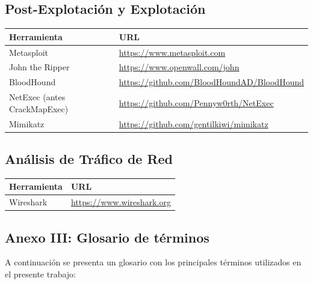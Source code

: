 \documentclass[a4paper, 11pt]{article}
\begin{document}
\subsection*{Post-Explotación y Explotación}
\begin{table}[H]
\centering
\begin{tabular}{|m{5cm}|m{10cm}|}
\hline
\textbf{Herramienta} & \textbf{URL} \\
\hline
Metasploit & \url{https://www.metasploit.com} \\
\hline
John the Ripper & \url{https://www.openwall.com/john} \\
\hline
BloodHound & \url{https://github.com/BloodHoundAD/BloodHound} \\
\hline
NetExec (antes CrackMapExec) & \url{https://github.com/Pennyw0rth/NetExec} \\
\hline
Mimikatz & \url{https://github.com/gentilkiwi/mimikatz} \\
\hline
\end{tabular}
\end{table}

\subsection*{Análisis de Tráfico de Red}
\begin{table}[H]
\centering
\begin{tabular}{|m{5cm}|m{10cm}|}
\hline
\textbf{Herramienta} & \textbf{URL} \\
\hline
Wireshark & \url{https://www.wireshark.org} \\
\hline
\end{tabular}
\end{table}


\clearpage

\subsection{Anexo III: Glosario de términos}

A continuación se presenta un glosario con los principales términos utilizados en el presente trabajo:
\end{document}
